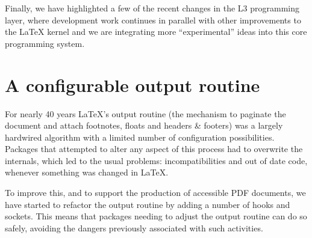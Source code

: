 \documentclass{ltnews}
\begin{document}
Finally, 
we have highlighted a few of the recent changes in the L3 programming layer, where 
development work continues in parallel with other improvements to the
\LaTeX{} kernel and we are integrating more \enquote{experimental} ideas
into this core programming system.



\section{A configurable output routine}

For nearly 40 years \LaTeX's output routine (the mechanism to paginate
the document and attach footnotes, floats and headers \& footers) was
a largely hardwired algorithm with a limited number of configuration
possibilities.  Packages that attempted to alter any 
aspect of this process had to overwrite the internals, which led to the usual
problems: incompatibilities and out of date code, whenever something
was changed in \LaTeX{}.

To improve this, and to support the production of accessible
PDF documents, we have started to refactor the output routine by adding a
number of hooks and sockets.  This means that  packages needing to adjust the
output routine can do so safely, avoiding the dangers previously associated 
with such activities. 
\end{document}
